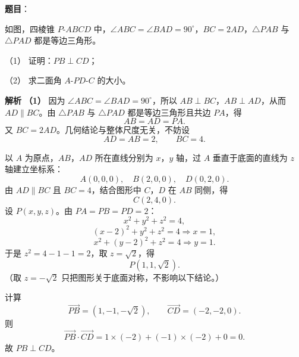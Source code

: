 \begin{answer}

\textbf{题目}：

如图，四棱锥 $P\text{-}ABCD$ 中，$\angle ABC=\angle BAD=90^\circ$，$BC=2AD$，$\triangle PAB$ 与 $\triangle PAD$ 都是等边三角形。

（1） 证明：$PB\perp CD$；

（2） 求二面角 $A\text{-}PD\text{-}C$ 的大小。
\nopagebreak[4]
\begin{center}\end{center}
\nopagebreak[4]
\textbf{解析}
\textbf{（1）} 因为 $\angle ABC=\angle BAD=90^\circ$，所以 $AB\perp BC$，$AB\perp AD$，从而 $AD\parallel BC$。由 $\triangle PAB$ 与 $\triangle PAD$ 都是等边三角形且共边 $PA$，得
\nopagebreak[4]
\[AB=AD=PA.\]
又 $BC=2AD$。几何结论与整体尺度无关，不妨设
\nopagebreak[4]
\[AD=AB=2,\qquad BC=4.\]

以 $A$ 为原点，$AB$，$AD$ 所在直线分别为 $x$，$y$ 轴，过 $A$ 垂直于底面的直线为 $z$ 轴建立坐标系：
\nopagebreak[4]
\[A(0,0,0),\quad B(2,0,0),\quad D(0,2,0).\]
由 $AD\parallel BC$ 且 $BC=4$，结合图形中 $C$，$D$ 在 $AB$ 同侧，得
\nopagebreak[4]
\[C(2,4,0).\]
设 $P(x,y,z)$。由 $PA=PB=PD=2$：
\nopagebreak[4]
\[x^2+y^2+z^2=4,\]
\nopagebreak[4]
\[(x-2)^2+y^2+z^2=4\Longrightarrow x=1,\]
\nopagebreak[4]
\[x^2+(y-2)^2+z^2=4\Longrightarrow y=1.\]
于是 $z^2=4-1-1=2$，取 $z=\sqrt2$，得
\nopagebreak[4]
\[P(1,1,\sqrt2).\]
（取 $z=-\sqrt2$ 只把图形关于底面对称，不影响以下结论。）

计算
\nopagebreak[4]
\[\overrightarrow{PB}=(1,-1,-\sqrt2),\qquad
\overrightarrow{CD}=(-2,-2,0).\]
则
\nopagebreak[4]
\[\overrightarrow{PB}\cdot\overrightarrow{CD}
=1\times(-2)+(-1)\times(-2)+0=0.\]
故 $PB\perp CD$。


\end{answer}
